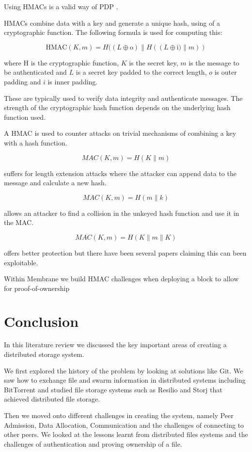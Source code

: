\documentclass[11pt, a4paper, twocolumn, twoside]{report}
\begin{document}
Using HMACs is a valid way of PDP \citep{ateniese2011remote}.

HMACs combine data with a key and generate a unique hash, using of a cryptographic function. \citep{krawczyk1997hmac} The following formula is used for computing this:

$$\mbox{HMAC}(K, m) = H((L \oplus \mbox{o}) \parallel H((L \oplus \mbox{i)} \parallel m))$$

where H is the cryptographic function, $K$ is the secret key, $m$ is the message to be authenticated and $L$ is a secret key padded to the correct length, $o$ is outer padding and $i$ is inner padding.

These are typically used to verify data integrity and authenticate messages. The strength of the cryptographic hash function depends on the underlying hash function used.

A HMAC is used to counter attacks on trivial mechanisms of combining a key with a hash function.

$$MAC(K, m) = H(K \parallel m)$$

suffers for length extension attacks where the attacker can append data to the message and calculate a new hash. 

$$MAC(K, m) = H(m \parallel k)$$

allows an attacker to find a collision in the unkeyed hash function and use it in the MAC. 

$$MAC(K, m) = H(K \parallel m \parallel K)$$ 

offers better protection but there have been several papers claiming this can been exploitable. \citep{bellare1996keying}

Within Membrane we build HMAC challenges when deploying a block to allow for proof-of-ownership

\section{Conclusion}
In this literature review we discussed the key important areas of creating a distributed storage system.

We first explored the history of the problem by looking at solutions like Git. We saw how to exchange file and swarm information in distributed systems including BitTorrent and studied file storage systems such as Resilio and Storj that achieved distributed file storage.

Then we moved onto different challenges in creating the system, namely Peer Admission, Data Allocation, Communication and the challenges of connecting to other peers. We looked at the lessons learnt from distributed files systems and the challenges of authentication and proving ownership of a file.
\end{document}
